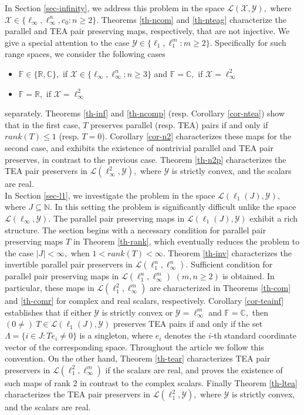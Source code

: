 \documentclass{amsart}
\theoremstyle{definition}
\theoremstyle{remark}
\numberwithin{equation}{section}
\begin{document}
   In Section \ref{sec-infinity}, we address this problem in the space $\mathcal{L}(\mathcal{X},\mathcal{Y}),$ where $\mathcal{X}\in \{\ell_\infty,\ell_\infty^n,c_0:n\geq 2\}.$  Theorems \ref{th-ncom} and \ref{th-nteag}  characterize the parallel and TEA pair preserving maps, respectively, that are not injective. We give a  special attention  to the case $\mathcal{Y}\in \{\ell_1,\ell_1^m:m\geq 2\}.$ Specifically for such range spaces,  we consider the following cases 
   \begin{itemize}
   	\item $\mathbb{F}\in \{\mathbb{R},\mathbb{C}\},$ if $\mathcal{X}\in \{\ell_\infty,\ell_\infty^n:n\geq 3\}$  and $\mathbb{F}=\mathbb{C},$ if $\mathcal{X}=\ell_\infty^2$ 
   	\item $\mathbb{F}=\mathbb{R},$ if $\mathcal{X}=\ell_\infty^2$ 
   \end{itemize}
   separately. Theorems \ref{th-inf} and  \ref{th-ncomp}  (resp. Corollary \ref{cor-ntea}) show that in the first case, $T$ preserves parallel (resp. TEA) pairs if and only if $rank(T)\leq 1$ (resp. $T=0$).  Corollary \ref{cor-n2} characterizes these maps for the second case, and exhibits the existence of nontrivial parallel and TEA pair preserves, in contrast to the previous case. Theorem \ref{th-n2p} characterizes the TEA pair preservers in $\mathcal{L}(\ell_\infty^2,\mathcal{Y}),$ where $\mathcal{Y}$ is strictly convex, and the scalars are real.\\
   In Section \ref{sec-l1}, we investigate the problem in the space $\mathcal{L}(\ell_1(J),\mathcal{Y}),$ where $J\subseteq \mathbb{N}.$ In this setting the problem is significantly difficult unlike the space $\mathcal{L}(\ell_\infty,\mathcal{Y}).$  The parallel pair  preserving maps in $\mathcal{L}(\ell_1(J),\mathcal{Y})$ exhibit a rich structure.  The section begins with a necessary condition for parallel pair preserving maps $T$ in Theorem \ref{th-rank}, which eventually reduces the problem to the case $|J|<\infty,$ when $1<rank(T)<\infty.$  Theorem \ref{th-inv} characterizes the invertible parallel pair preservers in $\mathcal{L}(\ell_1^n,\ell_\infty^n).$ Sufficient condition for parallel pair preserving maps in $\mathcal{L}(\ell_1^n,\ell_\infty^m)$ $(m,n\geq 2)$ is obtained. In particular, these maps in $\mathcal{L}(\ell_1^2,\ell_\infty^m)$ are characterized in Theorems \ref{th-com} and \ref{th-comr} for complex and real scalars, respectively.   Corollary \ref{cor-teainf} establishes that if either $\mathcal{Y}$ is strictly convex or $\mathcal{Y}=\ell_\infty^m$ and $\mathbb{F}=\mathbb{C},$ then   $(0\neq) ~T\in\mathcal{L}(\ell_1(J),\mathcal{Y})$ preserves TEA pairs  if and only if  the set  $\Lambda=\{i\in J:Te_i\neq 0\}$ is a singleton,  where   $e_i$ denotes the $i$-th standard coordinate vector of the corresponding space.   Throughout the article we follow this convention. 
   On the other hand, Theorem \ref{th-tear} characterizes TEA pair preservers in $\mathcal{L}(\ell_1^2,\ell_\infty^m)$ if the scalars are real, and proves the existence of such maps of rank 2 in contrast to the complex scalars. Finally Theorem \ref{th-ltea} characterizes the TEA pair preservers in $\mathcal{L}(\ell_1^2,\mathcal{Y}),$ where $\mathcal{Y}$ is strictly convex, and the scalars are real.\\ 
   
\end{document}

